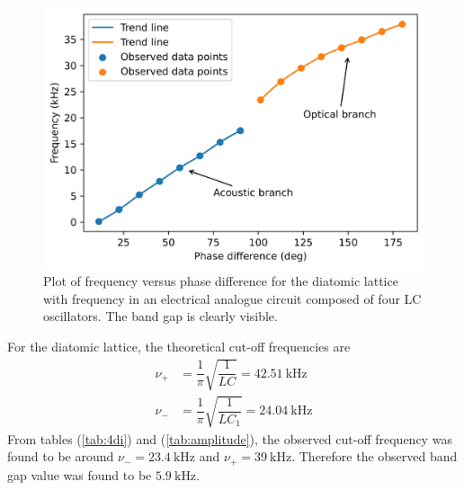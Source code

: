 \documentclass[%
 aip,
 amsmath,amssymb,
 reprint, floatfix%
]{revtex4-1}
\begin{document}
    \begin{figure}
        \centering
        \includegraphics[scale = 0.56]{Figures/plot-bandgap.png}
        \caption{Plot of frequency versus phase difference for the diatomic lattice with frequency in an electrical analogue circuit composed of four LC oscillators. The band gap is clearly visible.}
        \label{fig:4di}
    \end{figure}
    \par
    For the diatomic lattice, the theoretical cut-off frequencies are
    \begin{equation}
        \begin{split}
            \nu_{+} &= \dfrac{1}{\pi} \sqrt{\dfrac{1}{LC}} = \SI{42.51}{\kilo \hertz} \\
            \nu_{-} &= \dfrac{1}{\pi} \sqrt{\dfrac{1}{LC_1}} = \SI{24.04}{\kilo \hertz}
        \end{split}
    \end{equation}
    From tables (\ref{tab:4di}) and (\ref{tab:amplitude}), the observed cut-off frequency was found to be around $\nu_{-} = \SI{23.4}{\kilo \hertz}$ and $\nu_{+} = \SI{39}{\kilo \hertz}$. Therefore the observed band gap value was found to be $\SI{5.9}{\kilo \hertz}$.
\end{document}
